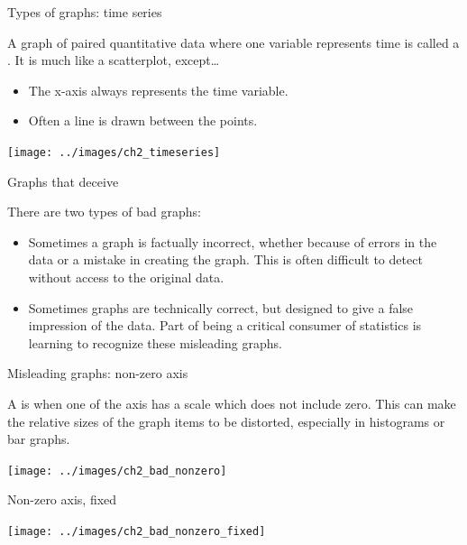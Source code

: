 \documentclass[xcolor=table, handout]{beamer}
\begin{document}
\begin{frame}{Types of graphs: time series}
\begin{block}{}
A graph of paired quantitative data where one variable represents time is called a . It is much like a scatterplot, except\ldots
\begin{itemize}
\item The x-axis always represents the time variable.
\item Often a line is drawn between the points.
\end{itemize}
\end{block}
\bigskip
{\centering
\texttt{[image: ../images/ch2\_timeseries]}
\par}

\end{frame}

\begin{frame}{Graphs that deceive}
\begin{block}{}
There are two types of bad graphs:
\begin{itemize}
\item Sometimes a graph is factually incorrect, whether because of errors in the data or a mistake in creating the graph. This is often difficult to detect without access to the original data.
\item Sometimes graphs are technically correct, but designed to give a false impression of the data. Part of being a critical consumer of statistics is learning to recognize these misleading graphs.
\end{itemize}
\end{block}
\end{frame}

\begin{frame}{Misleading graphs: non-zero axis}
\begin{block}{}
A  is when one of the axis has a scale which does not include zero. This can make the relative sizes of the graph items to be distorted, especially in histograms or bar graphs.
\end{block}
\pause
\begin{center}
\texttt{[image: ../images/ch2\_bad\_nonzero]}\par
\end{center}
\end{frame}

\begin{frame}{Non-zero axis, fixed}
\begin{center}
\texttt{[image: ../images/ch2\_bad\_nonzero\_fixed]} 
\end{center}
\end{frame}
\end{document}

